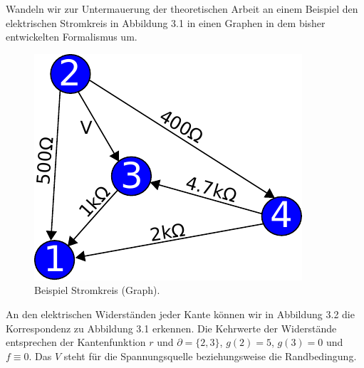 \documentclass[11pt,a4paper,leqno]{report}
\numberwithin{equation}{chapter}
\begin{document}
\noindent
Wandeln wir zur Untermauerung der theoretischen Arbeit an einem Beispiel den elektrischen Stromkreis in Abbildung 3.1 in einen Graphen in dem bisher entwickelten Formalismus um.
\begin{figure}[H]
	\begin{center}
		\includegraphics[scale=0.6]{Abbildungen/elektro.pdf}
		\caption{Beispiel Stromkreis (Graph).}
	\end{center}
\end{figure}
\noindent
An den elektrischen Widerst\"anden jeder Kante k\"onnen wir in Abbildung 3.2 die Korrespondenz zu Abbildung 3.1 erkennen. Die Kehrwerte der Widerst\"ande entsprechen der Kantenfunktion $r$ und $\partial=\{2, 3\}$, $g(2)=5$, $g(3)=0$ und $f\equiv 0$. Das $V$ steht f\"ur die Spannungsquelle beziehungsweise die Randbedingung.\\
\end{document}
